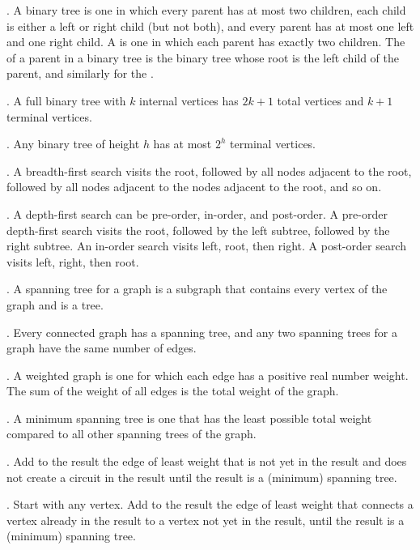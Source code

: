 \documentclass{slnotes}
\begin{document}
. A binary tree is one in which every parent has at most two children, each child is either a left or right child (but not both), and every parent has at most one left and one right child. A  is one in which each parent has exactly two children. The  of a parent in a binary tree is the binary tree whose root is the left child of the parent, and similarly for the .

. A full binary tree with \(k\) internal vertices has \(2k+1\) total vertices and \(k+1\) terminal vertices.

. Any binary tree of height \(h\) has at most \(2^h\) terminal vertices.

. A breadth-first search visits the root, followed by all nodes adjacent to the root, followed by all nodes adjacent to the nodes adjacent to the root, and so on.

. A depth-first search can be pre-order, in-order, and post-order. A pre-order depth-first search visits the root, followed by the left subtree, followed by the right subtree. An in-order search visits left, root, then right. A post-order search visits left, right, then root.

. A spanning tree for a graph is a subgraph that contains every vertex of the graph and is a tree.

. Every connected graph has a spanning tree, and any two spanning trees for a graph have the same number of edges.

. A weighted graph is one for which each edge has a positive real number weight. The sum of the weight of all edges is the total weight of the graph.

. A minimum spanning tree is one that has the least possible total weight compared to all other spanning trees of the graph.

. Add to the result the edge of least weight that is not yet in the result and does not create a circuit in the result until the result is a (minimum) spanning tree.

. Start with any vertex. Add to the result the edge of least weight that connects a vertex already in the result to a vertex not yet in the result, until the result is a (minimum) spanning tree.
\end{document}
